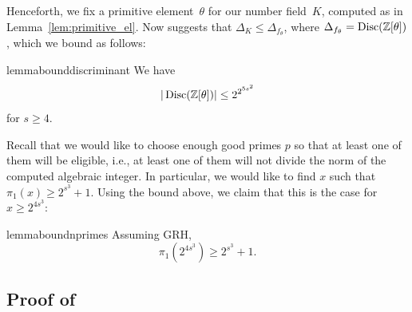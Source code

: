 Henceforth, we fix a primitive element~$\theta$ for our number field~$K$, computed as in Lemma~\ref{lem:primitive_el}. Now 
suggests that $\Delta_K \leq \Delta_{f_\theta}$, where $\Delta_{f_\theta} = \operatorname{Disc}(\mathbb{Z}[\theta])$, which we bound as follows:


\begin{restatable}{lemma}{bounddiscriminant}\label{lem:discriminant}
 We have
 \[ |\operatorname{Disc}(\mathbb{Z}[\theta])| \leq 2^{2^{5s^2}}\]
 for $s\geq 4$.
\end{restatable}

Recall that we would like to choose enough good primes $p$ so that at least one of them will be eligible, i.e., at least one of them will not divide the norm of the computed algebraic integer. In particular, we would like to find $x$ such that
 $\pi_{1}(x) \geq 2^{s^3} + 1$.
Using the bound above, we claim that this is the case for 
$x \geq 2^{4s^3}$:


\begin{restatable}{lemma}{boundnprimes}\label{prop:bound_p_conp}
Assuming GRH,
\[ \pi_{1}(2^{4s^3}) \geq  2^{s^3}  + 1.\]
\end{restatable}

\subsection{Proof of }


